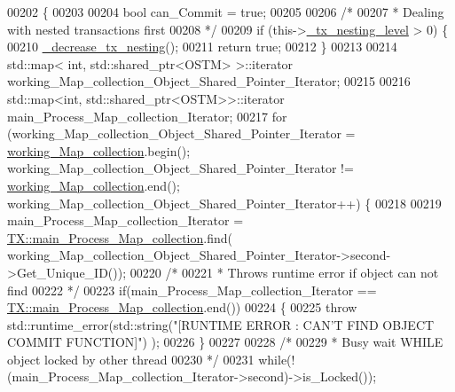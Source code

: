 \begin{DoxyCode}
00202                 \{
00203     
00204     \textcolor{keywordtype}{bool} can\_Commit = \textcolor{keyword}{true};
00205  
00206     \textcolor{comment}{/*}
00207 \textcolor{comment}{     * Dealing with nested transactions first 
}
00208 \textcolor{comment}{     */}
00209     \textcolor{keywordflow}{if} (this->\hyperlink{class_t_x_ae8f413fd7f4fea322e7ad3c668f9898e_ae8f413fd7f4fea322e7ad3c668f9898e}{\_tx\_nesting\_level} > 0) \{
00210         \hyperlink{class_t_x_aa3ac499f576326588628ade96b27b4b1_aa3ac499f576326588628ade96b27b4b1}{\_decrease\_tx\_nesting}();
00211         \textcolor{keywordflow}{return} \textcolor{keyword}{true};
00212     \} 
00213     
00214     std::map< int, std::shared\_ptr<OSTM> >::iterator working\_Map\_collection\_Object\_Shared\_Pointer\_Iterator;
00215 
00216     std::map<int, std::shared\_ptr<OSTM>>::iterator main\_Process\_Map\_collection\_Iterator;
00217     \textcolor{keywordflow}{for} (working\_Map\_collection\_Object\_Shared\_Pointer\_Iterator = 
      \hyperlink{class_t_x_a81aafda16e2f20e36ec6c68e584668ff_a81aafda16e2f20e36ec6c68e584668ff}{working\_Map\_collection}.begin(); working\_Map\_collection\_Object\_Shared\_Pointer\_Iterator
       != \hyperlink{class_t_x_a81aafda16e2f20e36ec6c68e584668ff_a81aafda16e2f20e36ec6c68e584668ff}{working\_Map\_collection}.end(); 
      working\_Map\_collection\_Object\_Shared\_Pointer\_Iterator++) \{
00218 
00219             main\_Process\_Map\_collection\_Iterator = 
      \hyperlink{class_t_x_a1a45d726894190695314464d7cd97c29_a1a45d726894190695314464d7cd97c29}{TX::main\_Process\_Map\_collection}.find(
      working\_Map\_collection\_Object\_Shared\_Pointer\_Iterator->second->Get\_Unique\_ID());
00220             \textcolor{comment}{/*}
00221 \textcolor{comment}{             * Throws runtime error if object can not find
}
00222 \textcolor{comment}{             */}
00223             \textcolor{keywordflow}{if}(main\_Process\_Map\_collection\_Iterator == 
      \hyperlink{class_t_x_a1a45d726894190695314464d7cd97c29_a1a45d726894190695314464d7cd97c29}{TX::main\_Process\_Map\_collection}.end())
00224             \{
00225                 \textcolor{keywordflow}{throw} std::runtime\_error(std::string(\textcolor{stringliteral}{"[RUNTIME ERROR : CAN'T FIND OBJECT COMMIT FUNCTION]"})
      );
00226             \} 
00227 
00228         \textcolor{comment}{/*}
00229 \textcolor{comment}{         * Busy wait WHILE object locked by other thread
}
00230 \textcolor{comment}{         */}
00231         \textcolor{keywordflow}{while}(!(main\_Process\_Map\_collection\_Iterator->second)->is\_Locked());

\end{DoxyCode}

